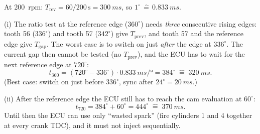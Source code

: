 \begin{solution}
At \SI{200}{rpm}: $T_{\text{rev}}=60/200\,\text{s}=\SI{300}{ms}$, so
$1^\circ\,\widehat{=}\,\SI{0.833}{ms}$.

(i) The ratio test at the reference edge ($360^\circ$) needs \emph{three}
consecutive rising edges: tooth 56 ($336^\circ$) and tooth 57 ($342^\circ$)
give $T_{\text{prev}}$, and tooth 57 and the reference edge give
$T_{\text{gap}}$. The worst case is to switch on just \emph{after} the edge at
$336^\circ$. The current gap then cannot be tested (no $T_{\text{prev}}$), and
the ECU has to wait for the next reference edge at $720^\circ$:
\[ t_{360} = (720^\circ-336^\circ)\cdot\SI{0.833}{ms/\degree}
   = 384^\circ \;\widehat{=}\; \SI{320}{ms}. \]
(Best case: switch on just before $336^\circ$, sync after $24^\circ=\SI{20}{ms}$.)

(ii) After the reference edge the ECU still has to reach the cam evaluation at
$60^\circ$:
\[ t_{720} = 384^\circ+60^\circ=444^\circ \;\widehat{=}\; \SI{370}{ms}. \]
Until then the ECU can use only ``wasted spark'' (fire cylinders 1 and 4
together at every crank TDC), and it must not inject sequentially.
\end{solution}

